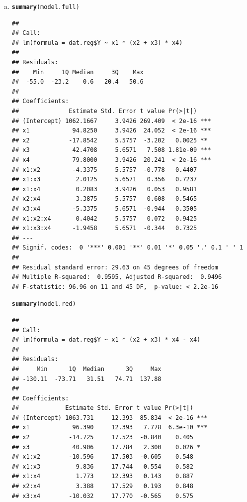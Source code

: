 \documentclass{article}\usepackage[]{graphicx}\usepackage[]{color}
\makeatletter
\newcommand{\hlstd}[1]{\textcolor[rgb]{0.345,0.345,0.345}{#1}}%
\newcommand{\hlkwd}[1]{\textcolor[rgb]{0.737,0.353,0.396}{\textbf{#1}}}%
\newenvironment{kframe}{%
 \def\at@end@of@kframe{}%
 \ifinner\ifhmode%
  \def\at@end@of@kframe{\end{minipage}}%
  \begin{minipage}{\columnwidth}%
 \fi\fi%
 \def\FrameCommand##1{\hskip\@totalleftmargin \hskip-\fboxsep
 \colorbox{shadecolor}{##1}\hskip-\fboxsep
     \hskip-\linewidth \hskip-\@totalleftmargin \hskip\columnwidth}%
 \MakeFramed {\advance\hsize-\width
   \@totalleftmargin\z@ \linewidth\hsize
   \@setminipage}}%
 {\par\unskip\endMakeFramed%
 \at@end@of@kframe}
\newenvironment{knitrout}{}{} %
\makeatother
\begin{document}
\begin{enumerate}[(a)]
\item

\begin{knitrout}
\color{fgcolor}\begin{kframe}
\begin{alltt}
  \hlkwd{summary}\hlstd{(model.full)}
\end{alltt}
\begin{verbatim}
## 
## Call:
## lm(formula = dat.reg$Y ~ x1 * (x2 + x3) * x4)
## 
## Residuals:
##    Min     1Q Median     3Q    Max 
##  -55.0  -23.2    0.6   20.4   50.6 
## 
## Coefficients:
##              Estimate Std. Error t value Pr(>|t|)    
## (Intercept) 1062.1667     3.9426 269.409  < 2e-16 ***
## x1            94.8250     3.9426  24.052  < 2e-16 ***
## x2           -17.8542     5.5757  -3.202   0.0025 ** 
## x3            42.4708     5.6571   7.508 1.81e-09 ***
## x4            79.8000     3.9426  20.241  < 2e-16 ***
## x1:x2         -4.3375     5.5757  -0.778   0.4407    
## x1:x3          2.0125     5.6571   0.356   0.7237    
## x1:x4          0.2083     3.9426   0.053   0.9581    
## x2:x4          3.3875     5.5757   0.608   0.5465    
## x3:x4         -5.3375     5.6571  -0.944   0.3505    
## x1:x2:x4       0.4042     5.5757   0.072   0.9425    
## x1:x3:x4      -1.9458     5.6571  -0.344   0.7325    
## ---
## Signif. codes:  0 '***' 0.001 '**' 0.01 '*' 0.05 '.' 0.1 ' ' 1
## 
## Residual standard error: 29.63 on 45 degrees of freedom
## Multiple R-squared:  0.9595,	Adjusted R-squared:  0.9496 
## F-statistic: 96.96 on 11 and 45 DF,  p-value: < 2.2e-16
\end{verbatim}
\begin{alltt}
  \hlkwd{summary}\hlstd{(model.red)}
\end{alltt}
\begin{verbatim}
## 
## Call:
## lm(formula = dat.reg$Y ~ x1 * (x2 + x3) * x4 - x4)
## 
## Residuals:
##     Min      1Q  Median      3Q     Max 
## -130.11  -73.71   31.51   74.71  137.88 
## 
## Coefficients:
##             Estimate Std. Error t value Pr(>|t|)    
## (Intercept) 1063.731     12.393  85.834  < 2e-16 ***
## x1            96.390     12.393   7.778  6.3e-10 ***
## x2           -14.725     17.523  -0.840    0.405    
## x3            40.906     17.784   2.300    0.026 *  
## x1:x2        -10.596     17.503  -0.605    0.548    
## x1:x3          9.836     17.744   0.554    0.582    
## x1:x4          1.773     12.393   0.143    0.887    
## x2:x4          3.388     17.529   0.193    0.848    
## x3:x4        -10.032     17.770  -0.565    0.575    

\end{verbatim}
\end{kframe}
\end{knitrout}
\end{enumerate}
\end{document}
